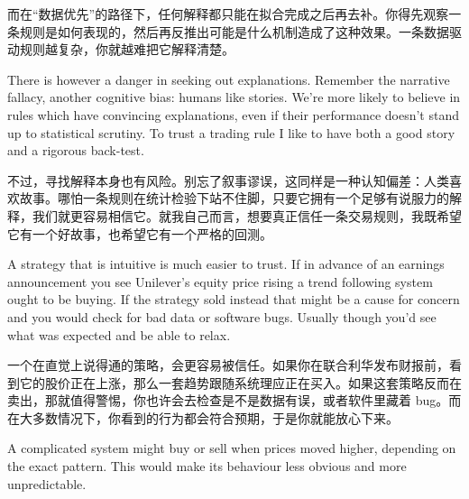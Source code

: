 \begin{chineseblock}而在“数据优先”的路径下，任何解释都只能在拟合完成之后再去补。你得先观察一条规则是如何表现的，然后再反推出可能是什么机制造成了这种效果。一条数据驱动规则越复杂，你就越难把它解释清楚。\end{chineseblock}

\bipairgap

\begin{englishblock} There is however a danger in seeking out explanations. Remember the narrative fallacy, another cognitive bias: humans like stories. We're more likely to believe in rules which have convincing explanations, even if their performance doesn't stand up to statistical scrutiny. To trust a trading rule I like to have both a good story and a rigorous back-test. \end{englishblock}

\begin{chineseblock}不过，寻找解释本身也有风险。别忘了叙事谬误，这同样是一种认知偏差：人类喜欢故事。哪怕一条规则在统计检验下站不住脚，只要它拥有一个足够有说服力的解释，我们就更容易相信它。就我自己而言，想要真正信任一条交易规则，我既希望它有一个好故事，也希望它有一个严格的回测。\end{chineseblock}


\begin{englishblock} A strategy that is intuitive is much easier to trust. If in advance of an earnings announcement you see Unilever's equity price rising a trend following system ought to be buying. If the strategy sold instead that might be a cause for concern and you would check for bad data or software bugs. Usually though you'd see what was expected and be able to relax. \end{englishblock}

\begin{chineseblock}一个在直觉上说得通的策略，会更容易被信任。如果你在联合利华发布财报前，看到它的股价正在上涨，那么一套趋势跟随系统理应正在买入。如果这套策略反而在卖出，那就值得警惕，你也许会去检查是不是数据有误，或者软件里藏着 bug。而在大多数情况下，你看到的行为都会符合预期，于是你就能放心下来。\end{chineseblock}

\bipairgap

\begin{englishblock} A complicated system might buy or sell when prices moved higher, depending on the exact pattern. This would make its behaviour less obvious and more unpredictable. \end{englishblock}


